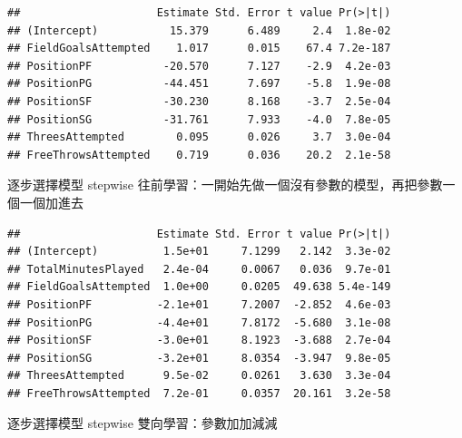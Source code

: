 \documentclass[]{book}
\newenvironment{Shaded}{\begin{snugshade}}{\end{snugshade}}
\newcommand{\CommentTok}[1]{\textcolor[rgb]{0.56,0.35,0.01}{\textit{#1}}}
\newcommand{\DataTypeTok}[1]{\textcolor[rgb]{0.13,0.29,0.53}{#1}}
\newcommand{\KeywordTok}[1]{\textcolor[rgb]{0.13,0.29,0.53}{\textbf{#1}}}
\newcommand{\NormalTok}[1]{#1}
\newcommand{\OperatorTok}[1]{\textcolor[rgb]{0.81,0.36,0.00}{\textbf{#1}}}
\newcommand{\OtherTok}[1]{\textcolor[rgb]{0.56,0.35,0.01}{#1}}
\newcommand{\StringTok}[1]{\textcolor[rgb]{0.31,0.60,0.02}{#1}}
\begin{document}
\begin{verbatim}
##                     Estimate Std. Error t value Pr(>|t|)
## (Intercept)           15.379      6.489     2.4  1.8e-02
## FieldGoalsAttempted    1.017      0.015    67.4 7.2e-187
## PositionPF           -20.570      7.127    -2.9  4.2e-03
## PositionPG           -44.451      7.697    -5.8  1.9e-08
## PositionSF           -30.230      8.168    -3.7  2.5e-04
## PositionSG           -31.761      7.933    -4.0  7.8e-05
## ThreesAttempted        0.095      0.026     3.7  3.0e-04
## FreeThrowsAttempted    0.719      0.036    20.2  2.1e-58
\end{verbatim}

逐步選擇模型 stepwise 往前學習：一開始先做一個沒有參數的模型，再把參數一個一個加進去

\begin{Shaded}
\end{Shaded}

\begin{verbatim}
##                     Estimate Std. Error t value Pr(>|t|)
## (Intercept)          1.5e+01     7.1299   2.142  3.3e-02
## TotalMinutesPlayed   2.4e-04     0.0067   0.036  9.7e-01
## FieldGoalsAttempted  1.0e+00     0.0205  49.638 5.4e-149
## PositionPF          -2.1e+01     7.2007  -2.852  4.6e-03
## PositionPG          -4.4e+01     7.8172  -5.680  3.1e-08
## PositionSF          -3.0e+01     8.1923  -3.688  2.7e-04
## PositionSG          -3.2e+01     8.0354  -3.947  9.8e-05
## ThreesAttempted      9.5e-02     0.0261   3.630  3.3e-04
## FreeThrowsAttempted  7.2e-01     0.0357  20.161  3.2e-58
\end{verbatim}

逐步選擇模型 stepwise 雙向學習：參數加加減減

\begin{Shaded}
\end{Shaded}
\end{document}
